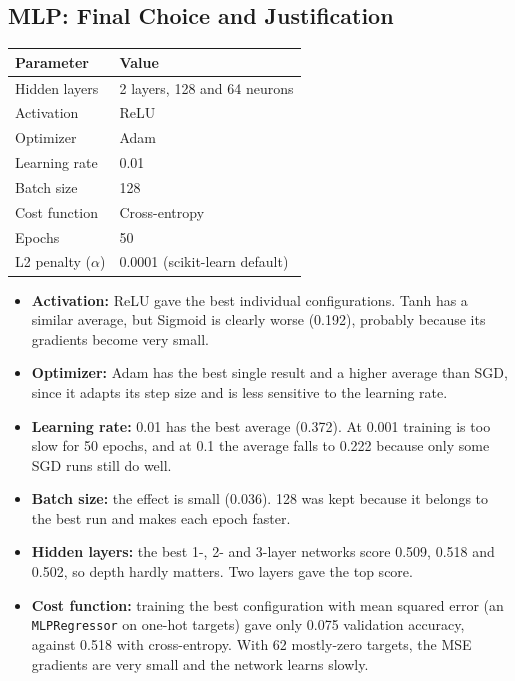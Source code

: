 \documentclass[12pt,a4paper]{article}
\begin{document}
\subsection{MLP: Final Choice and Justification}
\begin{table}[H]
\centering
\begin{tabular}{ll}
\toprule
Parameter & Value\\
\midrule
Hidden layers & 2 layers, 128 and 64 neurons \\
Activation & ReLU \\
Optimizer & Adam \\
Learning rate & 0.01 \\
Batch size & 128 \\
Cost function & Cross-entropy \\
Epochs & 50 \\
L2 penalty ($\alpha$) & 0.0001 (scikit-learn default) \\
\bottomrule
\end{tabular}
\end{table}

\begin{itemize}
\item \textbf{Activation:} ReLU gave the best individual configurations. Tanh has a similar average, but Sigmoid is clearly worse (0.192), probably because its gradients become very small.
\item \textbf{Optimizer:} Adam has the best single result and a higher average than SGD, since it adapts its step size and is less sensitive to the learning rate.
\item \textbf{Learning rate:} 0.01 has the best average (0.372). At 0.001 training is too slow for 50 epochs, and at 0.1 the average falls to 0.222 because only some SGD runs still do well.
\item \textbf{Batch size:} the effect is small (0.036). 128 was kept because it belongs to the best run and makes each epoch faster.
\item \textbf{Hidden layers:} the best 1-, 2- and 3-layer networks score 0.509, 0.518 and 0.502, so depth hardly matters. Two layers gave the top score.
\item \textbf{Cost function:} training the best configuration with mean squared error (an \texttt{MLPRegressor} on one-hot targets) gave only 0.075 validation accuracy, against 0.518 with cross-entropy. With 62 mostly-zero targets, the MSE gradients are very small and the network learns slowly.
\end{itemize}
\end{document}
